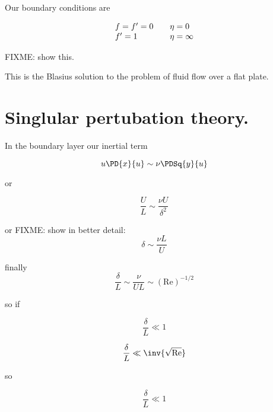 Our boundary conditions are

\begin{equation}\label{eqn:continuumL19:n}
\begin{array}{l l}
f = f' = 0 & \quad \mbox{$\eta = 0$} \\
f' = 1 & \quad \mbox{$\eta = \infty$} \\
\end{array}
\end{equation}

FIXME: show this.

This is the Blasius solution to the problem of fluid flow over a flat plate.

\section{Singlular pertubation theory.}

In the boundary layer our inertial term

\begin{equation}\label{eqn:continuumL19:n}
u \PD{x}{u} \sim \nu \PDSq{y}{u}
\end{equation}

or

\begin{equation}\label{eqn:continuumL19:n}
\frac{U}{L} \sim \frac{\nu U}{\delta^2}
\end{equation}

or
FIXME: show in better detail:
\begin{equation}\label{eqn:continuumL19:n}
\delta  \sim \frac{\nu L}{U}
\end{equation}

finally
\begin{equation}\label{eqn:continuumL19:n}
\frac{\delta}{L} \sim \frac{\nu}{U L} \sim (\text{Re})^{-1/2}
\end{equation}

so if

\begin{equation}\label{eqn:continuumL19:n}
\frac{\delta}{L} \ll 1
\end{equation}

\begin{equation}\label{eqn:continuumL19:n}
\frac{\delta}{L} \ll \inv{\sqrt{\text{Re}}}
\end{equation}

so 

\begin{equation}\label{eqn:continuumL19:n}
\frac{\delta}{L} \ll 1
\end{equation}

